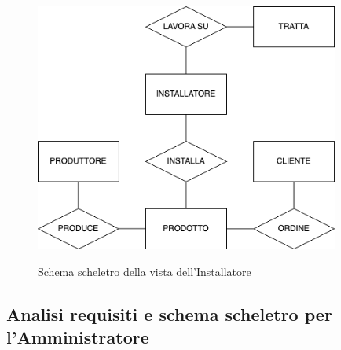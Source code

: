\documentclass{article}
\begin{document}
\begin{figure}[H]
    \centering
    \includegraphics[width=10cm]{images/installatore.drawio.png}\\
    \caption{Schema scheletro della vista dell'Installatore}
\end{figure}

\subsection{Analisi requisiti e schema scheletro per l'Amministratore}
\end{document}
